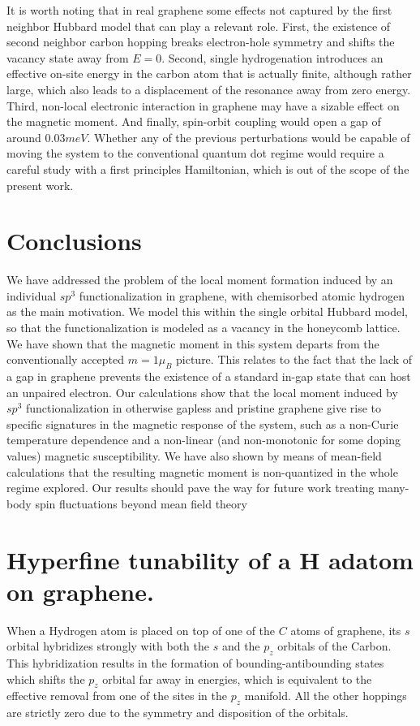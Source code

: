 It is worth noting that in real graphene some effects not captured by the first neighbor Hubbard model that can play a relevant role. First, the existence of second neighbor carbon hopping breaks electron-hole symmetry and shifts  the vacancy state away from $E=0$. Second, single hydrogenation introduces an effective on-site energy in the carbon atom that is actually finite, although rather large, which also leads to a displacement of the resonance away from zero energy.
Third, non-local electronic interaction in graphene may have a sizable effect on the magnetic moment.
And finally, spin-orbit coupling would open a gap of around $0.03meV$.
\cite{PhysRevB.80.235431}
Whether any of the previous perturbations would be capable of moving the system to the conventional quantum dot regime would require a careful study with a first principles Hamiltonian, which is out of the scope of the present work.

\section{Conclusions}
\label{sec:Concl}
We have addressed the problem of the local moment formation induced by an individual $sp^3$ functionalization in graphene, with chemisorbed atomic hydrogen as the  main motivation.  We model this within the single orbital Hubbard model, so that the functionalization is modeled as a vacancy in the  honeycomb lattice.  We have shown that the magnetic moment in this system  departs from  the conventionally accepted $m=1\mu_B$ picture. This relates to the fact that the lack of a gap in graphene prevents the existence of a standard in-gap state that can host an unpaired electron. Our calculations show that the local moment induced by $sp^3$ functionalization in otherwise gapless and pristine graphene
 give rise to specific signatures in the magnetic response of the system, such as a non-Curie temperature dependence and a non-linear (and non-monotonic for
some doping values) magnetic susceptibility.
We have also shown by means of mean-field calculations that the resulting magnetic moment is non-quantized in the whole regime explored. Our results should pave the way for future work treating many-body spin fluctuations beyond mean field theory\cite{haase2011magnetic,sofo2012magnetic,mitchell13}




\section{Hyperfine tunability of a H adatom on graphene.}
When a Hydrogen atom is placed on top of one of the $C$ atoms of graphene, its $s$ orbital hybridizes strongly with both the $s$ and the $p_z$ orbitals of the Carbon.
This hybridization results in the formation of bounding-antibounding states which shifts the $p_z$ orbital far away in energies, which is equivalent to the effective removal from one of the sites in the $p_z$ manifold.
All the other hoppings are strictly zero due to the symmetry and disposition of the orbitals.


